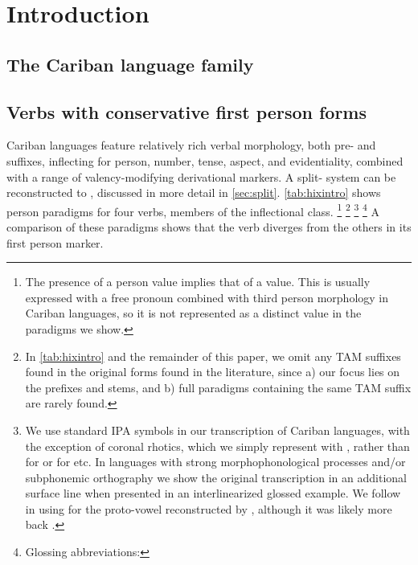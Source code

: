 \section{Introduction}
\label{sec:intro}

\subsection{The Cariban language family}

%


\subsection{Verbs with conservative first person forms}
\label{sec:irreg_intro}


Cariban languages feature relatively rich verbal morphology, both pre- and suffixes, inflecting for person, number, tense, aspect, and evidentiality, combined with a range of valency-modifying derivational markers.
A split- system can be reconstructed to \PC, discussed in more detail in \cref{sec:split}.
\cref{tab:hixintro} shows person paradigms for four \hixka verbs, members of the  inflectional class.%
\footnote{The presence of a  person value implies that of a  value.
This is usually expressed with a free pronoun combined with third person morphology in Cariban languages, so it is not represented as a distinct value in the paradigms we show.}%
\footnote{In \cref{tab:hixintro} and the remainder of this paper, we omit any TAM suffixes found in the original forms found in the literature, since a) our focus lies on the prefixes and stems, and b) full paradigms containing the same TAM suffix are rarely found.}%
\footnote{
We use standard IPA symbols in our transcription of Cariban languages, with the exception of coronal rhotics, which we simply represent with , rather than  for \wayana or  for \maqui etc.
In languages with strong morphophonological processes and/or subphonemic orthography we show the original transcription in an additional surface line when presented in an interlinearized glossed example.
We follow \textcite{gildea2018reconstructing} in using  for the proto-vowel reconstructed by \textcite{meira2005southern}, although it was likely more back \parencite{gildea2010story}.}
\footnote{Glossing abbreviations: }%
A comparison of these paradigms shows that the verb  diverges from the others in its first person marker.
